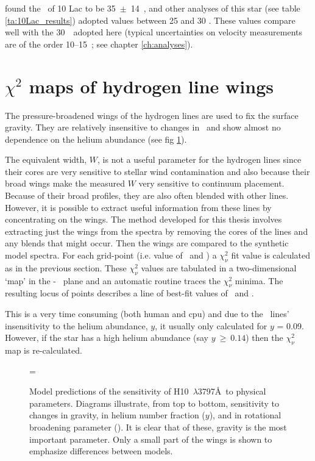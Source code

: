  found the \vsini\ of 10 Lac to be 35~$\pm$~14~\kms,
and other analyses of this star (see table \ref{ta:10Lac_results})
adopted values between 25 and 30 \kms. These values compare well with
the 30~\kms\ adopted here (typical uncertainties on velocity
measurements are of the order 10--15~\kms; see chapter \ref{ch:analyses}). 


\section{$\chi^2$ maps of hydrogen line wings}
\label{sec:chi-sq}

The pressure-broadened wings of the hydrogen lines are used to fix the
surface gravity. They are relatively insensitive to changes in \teff\
and show almost no dependence on the helium abundance (see fig
\ref{fig:h_sensitivity}).

The equivalent width, $W$, is not a useful parameter for the hydrogen
lines since their cores are very sensitive to stellar wind
contamination and also because their broad wings make the measured $W$
very sensitive to continuum placement. Because of their broad
profiles, they are also often blended with other lines. However, it is
possible to extract useful information from these lines by
concentrating on the wings. The method developed for this thesis
involves extracting just the wings from the spectra by removing the
cores of the lines and any blends that might occur. Then the wings are
compared to the synthetic model spectra. For each grid-point (i.e.
value of \teff\ and \logg) a $\chi_\nu^2$ fit value is calculated as
in the previous section. These $\chi_\nu^2$ values are tabulated in a
two-dimensional `map' in the \teff - \logg\ plane and an automatic
routine traces the $\chi_\nu^2$ minima. The resulting locus of
points describes a line of best-fit values of \teff\ and
\logg.

This is a very time consuming (both human and cpu) and due to the \hi\
lines' insensitivity to the helium abundance, $y$, it usually only
calculated for $y$ = 0.09. However, if the star has a high helium
abundance (say $y~\geq~0.14$) then the $\chi_\nu^2$ map is
re-calculated.

\begin{figure} %

\epsfxsize=\figwidth
\setlength{\cen}{(\textwidth / 2) - (\epsfxsize / 2)}
\hspace{\cen}

\caption[Sensitivity of \hi\ lines]
{\fcfont Model predictions of the sensitivity of H10~$\lambda$3797\AA\ to
physical parameters. Diagrams illustrate, from top to bottom,
sensitivity to changes in gravity, in helium number fraction
($y$), and in rotational broadening parameter (\vsini). It is
clear that of these, gravity is the most important parameter. Only
a small part of the wings is shown to emphasize differences between
models.}
\label{fig:h_sensitivity}
\end{figure} %

